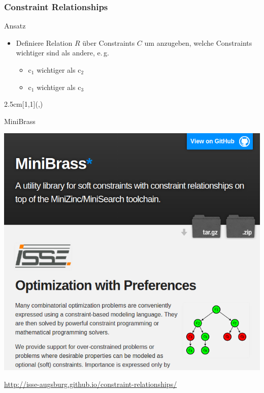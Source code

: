 \begin{frame}
\frametitle{Constraint Relationships}

Ansatz~\cite{Schiendorfer13}
\begin{itemize}
  \item Definiere Relation $R$ über Constraints $C$ um anzugeben, welche Constraints wichtiger sind als andere, e.\,g.
\begin{itemize}
  \item $\mathrm{c}_1$ wichtiger als $\mathrm{c}_2$

  \item $\mathrm{c}_1$ wichtiger als $\mathrm{c}_3$
\end{itemize}
\end{itemize}
\begin{textblock*}{2.5cm}[1,1](\textwidth-1.5cm,\textheight-2.03cm)
\end{textblock*}

\end{frame}

\begin{frame}[fragile]{MiniBrass}

\begin{center}

\includegraphics[width=.5\textwidth]{img/minibrass.png}

\vspace*{2ex}

\url{http://isse-augsburg.github.io/constraint-relationships/}

\end{center}

\end{frame}

